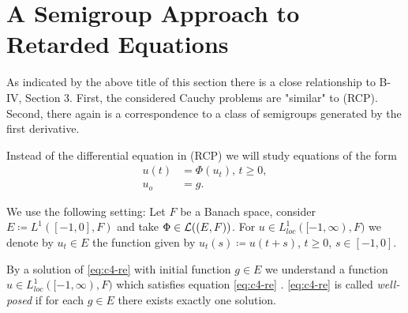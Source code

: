 
\section{A Semigroup Approach to Retarded Equations}\label{c4-3}
\hspace{1cm}{\Large by Annette Grabosch und Ulrich Moustakas}
\vspace{.5cm}
\newline

As indicated by the above title of this section there is a close relationship to B-IV, Section 3.
First, the considered Cauchy problems are "similar" to (RCP).
Second, there again is a correspondence to a class of semigroups generated by the first derivative.

Instead of the differential equation in (RCP) we will study equations of the form
\begin{equation*}\label{eq:c4-re} \tag{RE}
\begin{split} 
u(t) &= \Phi(u_t), \, t \geq 0,\\
u_o &= g.
\end{split}
\end{equation*}


We use the following setting: Let $F$ be a Banach space, consider $E \coloneqq L^{1}([-1,0],F)$ and take $\Phi \in \mathcal{L}((E,F))$.
For $u \in L^{1}_{loc}([-1,\infty),F)$ we denote by $u_t \in E$ the function given by $u_t(s) \coloneqq u(t+s)$, $t \geq 0$, $s \in [-1,0]$.

By a solution of \eqref{eq:c4-re} with initial function $g \in E$ we understand a function $u \in L^{1}_{loc}([-1,\infty),F)$ which satisfies equation \eqref{eq:c4-re} .
\eqref{eq:c4-re} is called \emph{well-posed} if for each $g \in E$ there exists exactly one solution.

